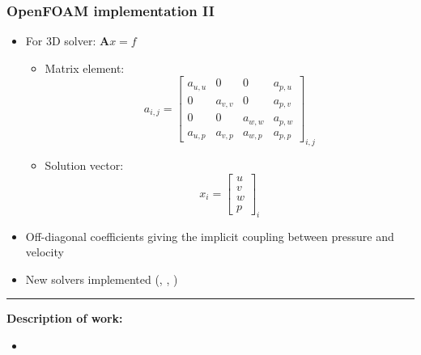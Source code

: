 \documentclass[9pt,handout]{beamer} %
\begin{document}
\begin{frame}%
\frametitle{OpenFOAM implementation II}
\begin{itemize}
    \item For 3D solver: $\mathbf{A}x = f$
    \begin{itemize}
        \item Matrix element:
            \begin{equation}
            a_{i,j} = 
            \begin{bmatrix}
            a_{u,u} & 0 & 0 & a_{p,u} \\
            0 & a_{v,v} & 0 & a_{p,v} \\
            0 & 0 & a_{w,w} & a_{p,w} \\
            a_{u,p} & a_{v,p} & a_{w,p} & a_{p,p} 
            \end{bmatrix}_{i,j}
            \end{equation}
        \item Solution vector:
            \begin{equation}
            x_{i} = 
            \begin{bmatrix}
            u \\ v \\ w \\ p
            \end{bmatrix}_{i}
            \end{equation}
    \end{itemize}
    \pause
    \item Off-diagonal coefficients giving the implicit coupling between pressure and velocity
    \pause
    \item New solvers implemented (, , )
\end{itemize}
\pause
\scriptsize
\vfill
\rule{0.5\textwidth}{0.5pt}\newline
{\bf Description of work:}
\begin{itemize}
    \item {}
\end{itemize}
\end{frame}
\end{document}
